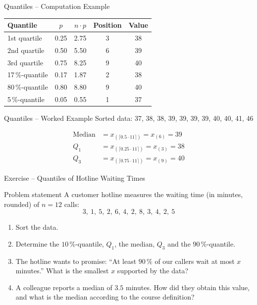 \documentclass[aspectratio=169,11pt]{beamer}
\begin{document}
\begin{frame}{Quantiles -- Computation Example}
  \begin{center}
    \normalsize
    \begin{tabular}{lcccc}
      \toprule
      Quantile & $p$ & $n \cdot p$ & Position & Value \\
      \midrule
      1st quartile & 0.25 & 2.75 & 3 & 38 \\
      2nd quartile & 0.50 & 5.50 & 6 & 39 \\
      3rd quartile & 0.75 & 8.25 & 9 & 40 \\
      17\,\%-quantile & 0.17 & 1.87 & 2 & 38 \\
      80\,\%-quantile & 0.80 & 8.80 & 9 & 40 \\
      5\,\%-quantile & 0.05 & 0.55 & 1 & 37 \\
      \bottomrule
    \end{tabular}
  \end{center}
\end{frame}

\begin{frame}{Quantiles -- Worked Example}
  Sorted data: 37, 38, 38, 39, 39, 39, 39, 40, 40, 41, 46

  \vspace{0.5cm}

  \begin{align*}
    \text{Median} &= x_{(\lceil 0.5 \cdot 11 \rceil)} = x_{(6)} = 39 \\
    Q_1 &= x_{(\lceil 0.25 \cdot 11 \rceil)} = x_{(3)} = 38 \\
    Q_3 &= x_{(\lceil 0.75 \cdot 11 \rceil)} = x_{(9)} = 40
  \end{align*}
\end{frame}

\begin{frame}{Exercise -- Quantiles of Hotline Waiting Times}
  \begin{block}{Problem statement}
    A customer hotline measures the waiting time (in minutes, rounded) of $n = 12$ calls:
    \[ 3,\ 1,\ 5,\ 2,\ 6,\ 4,\ 2,\ 8,\ 3,\ 4,\ 2,\ 5 \]
    \begin{enumerate}
      \item[a)] Sort the data.
      \item[b)] Determine the $10\,\%$-quantile, $Q_1$, the median, $Q_3$ and the $90\,\%$-quantile.
      \item[c)] The hotline wants to promise: ``At least $90\,\%$ of our callers wait at most
        $x$ minutes.'' What is the smallest $x$ supported by the data?
      \item[d)] A colleague reports a median of $3.5$ minutes. How did they obtain this value,
        and what is the median according to the course definition?
    \end{enumerate}
  \end{block}
\end{frame}
\end{document}
